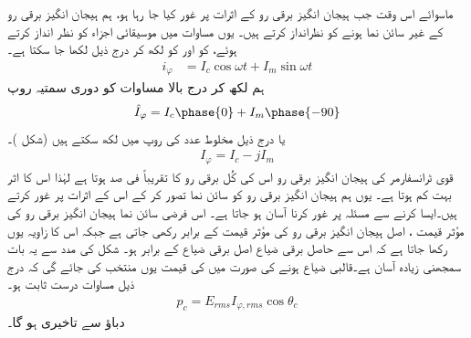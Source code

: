 ماسوائے اس وقت  جب  ہیجان انگیز برقی رو کے اثرات پر غور کیا جا رہا ہو، ہم ہیجان انگیز برقی رو کے غیر سائن نما ہونے کو نظرانداز کرتے ہیں۔ یوں  مساوات  میں  موسیقائی اجزاء کو نظر انداز کرتے ہوئے،  کو  اور  کو  لکھ کر درج ذیل لکھا جا سکتا ہے۔
\begin{align}
i_{\varphi}&=I_c\cos \omega t+I_m\sin \omega t
\end{align}
ہم  لکھ کر  درج بالا مساوات کو   دوری سمتیہ روپ
\begin{align}
\hat{I}_{\varphi}=I_c\phase{0}+I_m\phase{-90}
\end{align}
یا  درج ذیل مخلوط عدد کی روپ میں لکھ سکتے ہیں (شکل )۔
\begin{align}
I_{\varphi}=I_c-jI_m
\end{align}
 قوی ٹرانسفارمر کی   ہیجان انگیز برقی رو  اس  کی  کُل برقی رو کا تقریباً   فی صد  ہوتا ہے  لہٰذا  اس کا اثر بہت کم ہوتا ہے۔ یوں ہم  ہیجان انگیز برقی رو کو سائن نما تصور کر کے اس کے اثرات پر غور کرتے ہیں۔ایسا کرنے سے مسئلہ پر غور کرنا آسان ہو جاتا ہے۔ اس فرضی سائن نما  ہیجان انگیز برقی رو   کی مؤثر قیمت  ، اصل  ہیجان انگیز برقی رو کی مؤثر قیمت کے برابر رکھی جاتی ہے جبکہ اس کا زاویہ  یوں رکھا جاتا ہے کہ اس سے حاصل برقی ضیاع اصل برقی ضیاع کے برابر ہو۔ شکل   کی مدد سے یہ بات سمجھنی زیادہ آسان ہے۔قالبی ضیاع  ہونے کی صورت میں  کی قیمت یوں منتخب کی جائے گی کہ درج ذیل مساوات درست ثابت ہو۔
\begin{align}
p_c=E_{rms} I_{\varphi,rms} \cos \theta_c
\end{align}
 دباؤ   سے   تاخیری ہو گا۔


